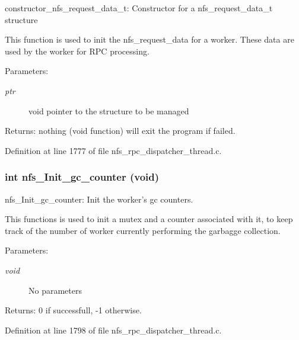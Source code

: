 constructor\_\-nfs\_\-request\_\-data\_\-t: Constructor for a nfs\_\-request\_\-data\_\-t structure

This function is used to init the nfs\_\-request\_\-data for a worker. These data are used by the worker for RPC processing.

\begin{Desc}
\item[Parameters:]
\begin{description}
\item[{\em ptr}]void pointer to the structure to be managed\end{description}
\end{Desc}
\begin{Desc}
\item[Returns:]nothing (void function) will exit the program if failed. \end{Desc}


Definition at line 1777 of file nfs\_\-rpc\_\-dispatcher\_\-thread.c.
\subsubsection[{nfs\_\-Init\_\-gc\_\-counter}]{\setlength{\rightskip}{0pt plus 5cm}int nfs\_\-Init\_\-gc\_\-counter (void)}\label{nfs__rpc__dispatcher__thread_8c_47e8bde054e96db98693ae1d2d74cd43}


nfs\_\-Init\_\-gc\_\-counter: Init the worker's gc counters.

This functions is used to init a mutex and a counter associated with it, to keep track of the number of worker currently performing the garbagge collection.

\begin{Desc}
\item[Parameters:]
\begin{description}
\item[{\em void}]No parameters\end{description}
\end{Desc}
\begin{Desc}
\item[Returns:]0 if successfull, -1 otherwise. \end{Desc}


Definition at line 1798 of file nfs\_\-rpc\_\-dispatcher\_\-thread.c.
